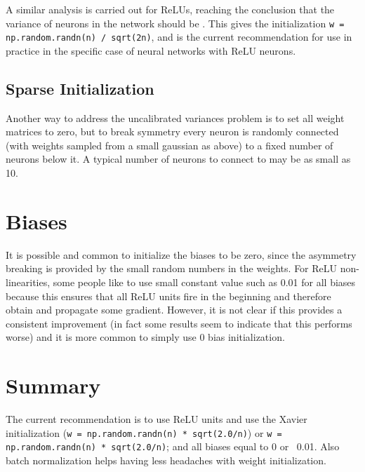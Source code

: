 A similar analysis is carried out for ReLUs, reaching the conclusion that the variance of neurons in the network should be . This gives the initialization \texttt{w = np.random.randn(n) / sqrt(2n)}, and is the current recommendation for use in practice in the specific case of neural networks with ReLU neurons.

\subsection*{Sparse Initialization}
Another way to address the uncalibrated variances problem is to set all weight matrices to zero, but to break symmetry every neuron is randomly connected (with weights sampled from a small gaussian as above) to a fixed number of neurons below it. A typical number of neurons to connect to may be as small as 10.

\section{Biases}
It is possible and common to initialize the biases to be zero, since the asymmetry breaking is provided by the small random numbers in the weights. For ReLU non-linearities, some people like to use small constant value such as 0.01 for all biases because this ensures that all ReLU units fire in the beginning and therefore obtain and propagate some gradient. However, it is not clear if this provides a consistent improvement (in fact some results seem to indicate that this performs worse) and it is more common to simply use 0 bias initialization.

\section*{Summary}
The current recommendation is to use ReLU units and use the Xavier initialization (\texttt{w = np.random.randn(n) * sqrt(2.0/n)}) or \texttt{w = np.random.randn(n) * sqrt(2.0/n)}; and all biases equal to 0 or ~0.01. Also batch normalization helps having less headaches with weight initialization.